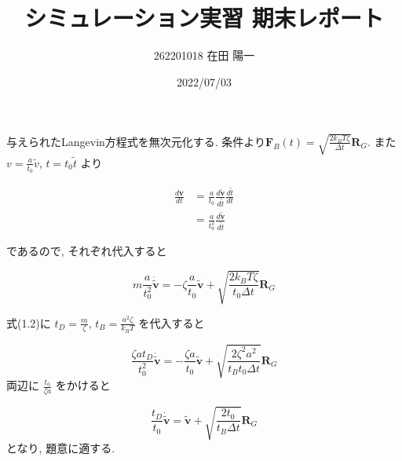 \documentclass[a4paper,dvipdfmx]{jarticle}
\begin{document}
\title{シミュレーション実習 期末レポート}
\author{262201018 在田 陽一}
\date{2022/07/03}
\maketitle


\section{}
\subsection{}

\noindent
与えられたLangevin方程式を無次元化する.
条件より$\bm{F}_B(t)=\sqrt{\frac{2k_BT\zeta}{\Delta t}}\bm{R}_G$. 
また $v=\frac{a}{t_0}\tilde{v}$, $t=t_0\tilde{t}$ より

\begin{align*}
    \frac{d\bm{v}}{dt} &= \frac{a}{t_0}\frac{d\bm{\tilde{v}}}{d\tilde{t}} \frac{d\tilde{t}}{dt} \\ 
    &= \frac{a}{t_0^2} \frac{d\bm{\tilde{v}}}{d\tilde{t}}  \tag{1.1}
\end{align*}

\noindent
であるので, それぞれ代入すると

\begin{equation}
    m \frac{a}{t_0^2} \bm{\dot{\tilde{v}}} = -\zeta \frac{a}{t_0} \bm{\tilde{v}} 
    + \sqrt{\frac{2k_BT \zeta}{t_0 \Delta t}}\bm{R}_G \tag{1.2}
\end{equation}

\noindent
式(1.2)に $t_D=\frac{m}{\zeta}$, $t_B=\frac{a^2 \zeta}{k_BT}$ を代入すると

\begin{equation}
    \frac{\zeta at_D}{t_0^2} \bm{\dot{\tilde{v}}} = -\frac{\zeta a}{t_0} \bm{\tilde{v}} 
    + \sqrt{\frac{2\zeta ^2a^2}{t_Bt_0 \Delta t}}\bm{R}_G \tag{1.3} 
\end{equation}
両辺に $\frac{t_0}{\zeta a}$ をかけると

\begin{equation}
    \frac{t_D}{t_0} \bm{\dot{\tilde{v}}} = \bm{\tilde{v}} 
    + \sqrt{\frac{2t_0}{t_B\Delta t}}\bm{R}_G \tag{1.4} 
\end{equation}
となり, 題意に適する.


\subsection{}
\end{document}
